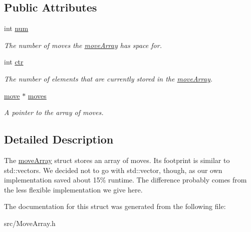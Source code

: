 \subsection*{Public Attributes}
\begin{DoxyCompactItemize}
\item 
\mbox{\label{structmoveArray_a5613065aad1d00414461f416c6b4b724}} 
int \hyperlink{structmoveArray_a5613065aad1d00414461f416c6b4b724}{num}
\begin{DoxyCompactList}\small\item\em The number of moves the \hyperlink{structmoveArray}{move\+Array} has space for. \end{DoxyCompactList}\item 
\mbox{\label{structmoveArray_a9dbadb0980be9c133d9587c8572a1c49}} 
int \hyperlink{structmoveArray_a9dbadb0980be9c133d9587c8572a1c49}{ctr}
\begin{DoxyCompactList}\small\item\em The number of elements that are currently stored in the \hyperlink{structmoveArray}{move\+Array}. \end{DoxyCompactList}\item 
\mbox{\label{structmoveArray_a6f6b1dbbae6cdaea0e321c58a8a1d4ce}} 
\hyperlink{structmove}{move} $\ast$ \hyperlink{structmoveArray_a6f6b1dbbae6cdaea0e321c58a8a1d4ce}{moves}
\begin{DoxyCompactList}\small\item\em A pointer to the array of moves. \end{DoxyCompactList}\end{DoxyCompactItemize}


\subsection{Detailed Description}
The \hyperlink{structmoveArray}{move\+Array} struct stores an array of moves. Its footprint is similar to std\+::vector\textquotesingle{}s. We decided not to go with std\+::vector, though, as our own implementation saved about 15\% runtime. The difference probably comes from the less flexible implementation we give here. 

The documentation for this struct was generated from the following file\+:\begin{DoxyCompactItemize}
\item 
src/Move\+Array.\+h\end{DoxyCompactItemize}
